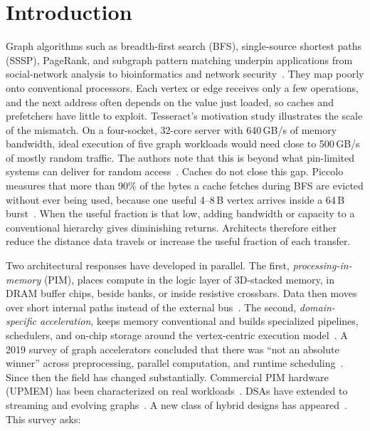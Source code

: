 \documentclass[journal,onecolumn]{IEEEtran}
\begin{document}
\section{Introduction}
Graph algorithms such as breadth-first search (BFS), single-source shortest paths (SSSP), PageRank, and subgraph pattern matching underpin applications from social-network analysis to bioinformatics and network security~\cite{ahn2015tesseract,ham2016graphicionado,asquini2025tc}. They map poorly onto conventional processors. Each vertex or edge receives only a few operations, and the next address often depends on the value just loaded, so caches and prefetchers have little to exploit. Tesseract's motivation study illustrates the scale of the mismatch. On a four-socket, 32-core server with 640\,GB/s of memory bandwidth, ideal execution of five graph workloads would need close to 500\,GB/s of mostly random traffic. The authors note that this is beyond what pin-limited systems can deliver for random access~\cite{ahn2015tesseract}. Caches do not close this gap. Piccolo measures that more than 90\% of the bytes a cache fetches during BFS are evicted without ever being used, because one useful 4--8\,B vertex arrives inside a 64\,B burst~\cite{shin2025piccolo}. When the useful fraction is that low, adding bandwidth or capacity to a conventional hierarchy gives diminishing returns. Architects therefore either reduce the distance data travels or increase the useful fraction of each transfer.

Two architectural responses have developed in parallel. The first, \emph{processing-in-memory} (PIM), places compute in the logic layer of 3D-stacked memory, in DRAM buffer chips, beside banks, or inside resistive crossbars. Data then moves over short internal paths instead of the external bus~\cite{ahn2015tesseract,song2018graphr,gomezluna2022prim}. The second, \emph{domain-specific acceleration}, keeps memory conventional and builds specialized pipelines, schedulers, and on-chip storage around the vertex-centric execution model~\cite{ham2016graphicionado,mukkara2018hats,yan2019graphdyns}. A 2019 survey of graph accelerators concluded that there was ``not an absolute winner'' across preprocessing, parallel computation, and runtime scheduling~\cite{gui2019survey}. Since then the field has changed substantially. Commercial PIM hardware (UPMEM) has been characterized on real workloads~\cite{gomezluna2022prim,barkhordar2025alphapim}. DSAs have extended to streaming and evolving graphs~\cite{rahman2021jetstream,zhao2022tdgraph,gao2023mega}. A new class of hybrid designs has appeared~\cite{shin2025piccolo,shin2025fala,yenimol2026cograf}. This survey asks:
\end{document}
